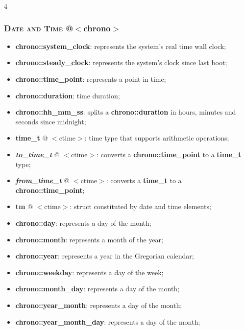 \documentclass[10pt]{article}
\begin{document}
\begin{multicols*}{4}
{{\subsubsection*{\textsc{Date and Time} @$<$chrono$>$} 
\begin{itemize}[leftmargin=*,topsep=0.25pt]
  \setlength\itemsep{-1.8pt}
\item  {\textbf{chrono::system\_clock}}: represents the system's real time wall clock; 
\item  {\textbf{chrono::steady\_clock}}: represents the system's clock since last boot; 
\item  {\textbf{chrono::time\_point}}: represents a point in time; 
\item  {\textbf{chrono::duration}}: time duration; 
\item  {\textbf{chrono::hh\_mm\_ss}}: splits a \textbf{chrono::duration} in hours, minutes and seconds since midnight;
\item  {\textbf{time\_t}} @ $<$ctime$>$: time type that supports arithmetic operations;
\item  \emph{\textbf{to\_time\_t}} @ $<$ctime$>$: converts a \textbf{chrono::time\_point} to a {\textbf{time\_t}} type;
\item  \emph{\textbf{from\_time\_t}} @ $<$ctime$>$: converts a {\textbf{time\_t}} to a \textbf{chrono::time\_point};
\item  \textbf{tm} @ $<$ctime$>$: struct constituted by date and time elements;
\item  {\textbf{chrono::day}}: represents a day of the month;
\item  {\textbf{chrono::month}}: represents a month of the year;
\item  {\textbf{chrono::year}}: represents a year in the Gregorian calendar;
\item  {\textbf{chrono::weekday}}: represents a day of the week;
\item  {\textbf{chrono::month\_day}}: represents a day of the month;
\item  {\textbf{chrono::year\_month}}: represents a day of the month;
\item  {\textbf{chrono::year\_month\_day}}: represents a day of the month;
\end{itemize}

}}
\end{multicols*}
\end{document}
